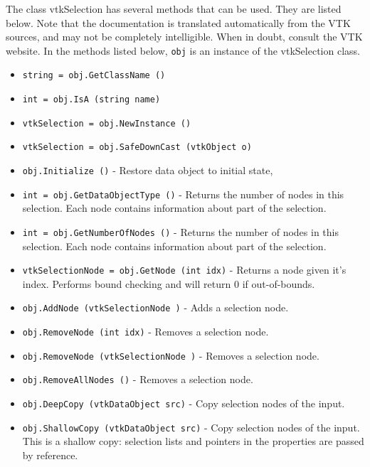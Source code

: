 The class vtkSelection has several methods that can be used.
  They are listed below.
Note that the documentation is translated automatically from the VTK sources,
and may not be completely intelligible.  When in doubt, consult the VTK website.
In the methods listed below, \verb|obj| is an instance of the vtkSelection class.
\begin{itemize}
\item  \verb|string = obj.GetClassName ()|

\item  \verb|int = obj.IsA (string name)|

\item  \verb|vtkSelection = obj.NewInstance ()|

\item  \verb|vtkSelection = obj.SafeDownCast (vtkObject o)|

\item  \verb|obj.Initialize ()| -  Restore data object to initial state,

\item  \verb|int = obj.GetDataObjectType ()| -  Returns the number of nodes in this selection.
 Each node contains information about part of the selection.

\item  \verb|int = obj.GetNumberOfNodes ()| -  Returns the number of nodes in this selection.
 Each node contains information about part of the selection.

\item  \verb|vtkSelectionNode = obj.GetNode (int idx)| -  Returns a node given it's index. Performs bound checking
 and will return 0 if out-of-bounds.

\item  \verb|obj.AddNode (vtkSelectionNode )| -  Adds a selection node.

\item  \verb|obj.RemoveNode (int idx)| -  Removes a selection node.

\item  \verb|obj.RemoveNode (vtkSelectionNode )| -  Removes a selection node.

\item  \verb|obj.RemoveAllNodes ()| -  Removes a selection node.

\item  \verb|obj.DeepCopy (vtkDataObject src)| -  Copy selection nodes of the input.

\item  \verb|obj.ShallowCopy (vtkDataObject src)| -  Copy selection nodes of the input.
 This is a shallow copy: selection lists and pointers in the
 properties are passed by reference.


\end{itemize}
